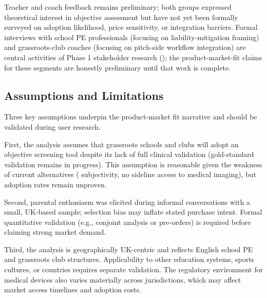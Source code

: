 Teacher and coach feedback remains preliminary; both groups expressed theoretical interest in objective assessment but have not yet been formally surveyed on adoption likelihood, price sensitivity, or integration barriers. Formal interviews with school PE professionals (focusing on liability-mitigation framing) and grassroots-club coaches (focusing on pitch-side workflow integration) are central activities of Phase 1 stakeholder research (); the product-market-fit claims for these segments are honestly preliminary until that work is complete.


\subsection{Assumptions and Limitations}
\label{sec:ent-pmf-assumptions}

Three key assumptions underpin the product-market fit narrative and should be validated during user research.

First, the analysis assumes that grassroots schools and clubs will adopt an objective screening tool despite its lack of full clinical validation (gold-standard validation remains in progress). This assumption is reasonable given the weakness of current alternatives ( subjectivity, no sideline access to medical imaging), but adoption rates remain unproven.

Second, parental enthusiasm was elicited during informal conversations with a small, UK-based sample; selection bias may inflate stated purchase intent. Formal quantitative validation (e.g., conjoint analysis or pre-orders) is required before claiming strong market demand.

Third, the analysis is geographically UK-centric and reflects English school PE and grassroots club structures. Applicability to other education systems, sports cultures, or countries requires separate validation. The regulatory environment for medical devices also varies materially across jurisdictions, which may affect market access timelines and adoption costs.

